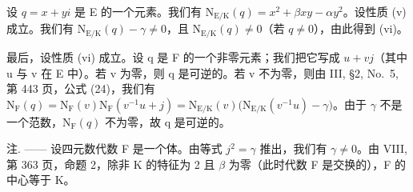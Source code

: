 设 \(q = x + yi\) 是 E 的一个元素。我们有 \(\mathrm{N}_{\mathrm{E / K}}(q) = x^2 + \beta xy - \alpha y^2\)。设性质 (v) 成立。我们有 \(\mathrm{N}_{\mathrm{E / K}}(q) - \gamma \neq 0\)，且 \(\mathrm{N}_{\mathrm{E / K}}(q) \neq 0\)（若 \(q \neq 0\)），由此得到 (vi)。

最后，设性质 (vi) 成立。设 q 是 F 的一个非零元素；我们把它写成 \(u + vj\)（其中 u 与 v 在 E 中）。若 v 为零，则 q 是可逆的。若 v 不为零，则由 III, §2, No.~5, 第 443 页，公式 (24)，我们有 \(\mathrm{N}_{\mathrm{F}}(q) = \mathrm{N}_{\mathrm{F}}(v)\mathrm{N}_{\mathrm{F}}(v^{-1}u + j) = \mathrm{N}_{\mathrm{E}/\mathrm{K}}(v)\big(\mathrm{N}_{\mathrm{E}/\mathrm{K}}(v^{-1}u) - \gamma\big)\)。由于 \(\gamma\) 不是一个范数，\(\mathrm{N}_{\mathrm{F}}(q)\) 不为零，故 q 是可逆的。

注. —— 设四元数代数 F 是一个体。由等式 \(j^{2} = \gamma\) 推出，我们有 \(\gamma \neq 0\)。由 VIII, 第 363 页，命题 2，除非 K 的特征为 2 且 \(\beta\) 为零（此时代数 F 是交换的），F 的中心等于 K。

